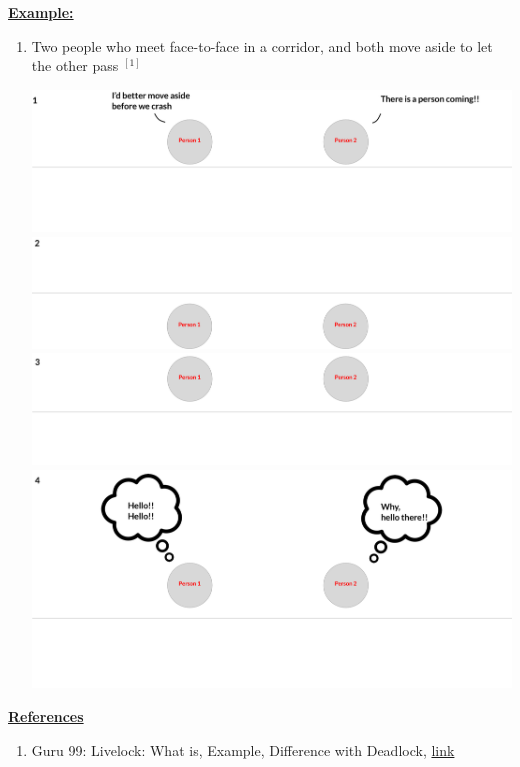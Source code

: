 \documentclass[12pt]{article}
\begin{document}
\begin{itemize}
\begin{itemize}
        \bigskip

        \underline{\textbf{Example:}}

        \bigskip

        \begin{enumerate}[1.]
            \item Two people who meet face-to-face in a corridor, and both move
            aside to let the other pass $^{[1]}$

            \begin{center}
                \includegraphics[width=\linewidth]{images/week_10_notes_1_5.png}
                \includegraphics[width=\linewidth]{images/week_10_notes_1_6.png}
                \includegraphics[width=\linewidth]{images/week_10_notes_1_7.png}
                \includegraphics[width=\linewidth]{images/week_10_notes_1_8.png}
            \end{center}
        \end{enumerate}
    \end{itemize}

    \bigskip

    \underline{\textbf{References}}

    \bigskip

    \begin{enumerate}[1)]
        \item Guru 99: Livelock: What is, Example, Difference with Deadlock, \href{https://www.guru99.com/what-is-livelock-example.html}{link}
    \end{enumerate}
\end{itemize}
\end{document}
